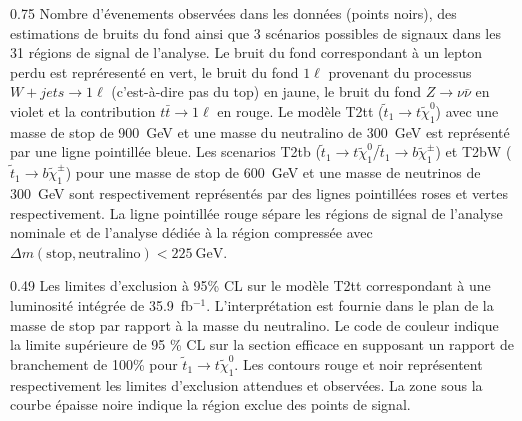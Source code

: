                  {0.75}       %
                 {Nombre d'évenements observées dans les données (points noirs), des estimations de bruits du fond ainsi que 3 scénarios possibles de signaux dans les 31 régions de signal de l'analyse. Le bruit du fond correspondant à un lepton perdu est repréresenté en vert, le bruit du fond  $ 1 \ell $ provenant du processus $ W + jets \to 1 \ell $ (c'est-à-dire pas du top) en jaune, le bruit du fond $ Z \to \nu \bar {\nu} $  en violet et la contribution $ t \bar {t} \to 1 \ell $ en rouge. Le modèle T2tt ($ \tilde{t}_{1} \to t \tilde {\chi}^{0}_{1} $) avec une masse de stop de 900~GeV et une masse du neutralino de 300~GeV est représenté par une ligne pointillée bleue. Les scenarios T2tb ($\tilde{t}_{1} \to t \tilde{\chi}^{0}_{1} /\tilde{t}_{1} \to b \tilde{\chi}^{\pm}_{1}$) et T2bW ($\tilde{t}_{1} \to b \tilde{\chi}^{\pm}_{1} $) pour une masse de stop de 600~GeV et une masse de neutrinos de 300~GeV sont respectivement représentés par des lignes pointillées roses et vertes respectivement. La ligne pointillée rouge sépare les régions de signal de l'analyse  nominale et de l'analyse dédiée à la région compressée avec $\Delta m\mathrm{(stop, neutralino)<225~GeV}$. }

                 {0.49}       %
                 {Les limites d'exclusion à 95\% CL sur le modèle T2tt correspondant à une luminosité intégrée de 35.9~fb$^{-1}$. L'interprétation est fournie  dans le plan de la masse de stop par rapport à la masse du neutralino. Le code de couleur indique la limite supérieure de 95 \% CL sur la section efficace en supposant un rapport de branchement de 100\% pour $ \tilde {t}_{1} \to t \tilde{\chi}^{0}_{1} $. Les contours rouge et noir représentent respectivement les limites d'exclusion attendues et observées. La zone sous la courbe épaisse noire indique la région exclue des points de signal. }

